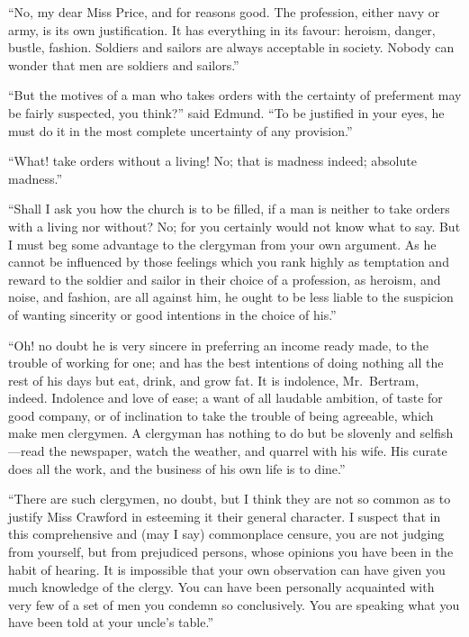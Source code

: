 \documentclass{article}
\begin{document}
``No, my dear Miss Price, and for reasons good.  The profession,
either navy or army, is its own justification.  It has
everything in its favour:  heroism, danger, bustle, fashion.
Soldiers and sailors are always acceptable in society.
Nobody can wonder that men are soldiers and sailors.''

``But the motives of a man who takes orders with the certainty
of preferment may be fairly suspected, you think?''
said Edmund.  ``To be justified in your eyes, he must
do it in the most complete uncertainty of any provision.''

``What! take orders without a living!  No; that is
madness indeed; absolute madness.''

``Shall I ask you how the church is to be filled, if a man
is neither to take orders with a living nor without?
No; for you certainly would not know what to say.
But I must beg some advantage to the clergyman from
your own argument.  As he cannot be influenced by those
feelings which you rank highly as temptation and reward
to the soldier and sailor in their choice of a profession,
as heroism, and noise, and fashion, are all against him,
he ought to be less liable to the suspicion of wanting
sincerity or good intentions in the choice of his.''

``Oh! no doubt he is very sincere in preferring an income
ready made, to the trouble of working for one; and has
the best intentions of doing nothing all the rest of his
days but eat, drink, and grow fat.  It is indolence,
Mr.\ Bertram, indeed.  Indolence and love of ease; a want
of all laudable ambition, of taste for good company,
or of inclination to take the trouble of being agreeable,
which make men clergymen.  A clergyman has nothing
to do but be slovenly and selfish---read the newspaper,
watch the weather, and quarrel with his wife.  His curate
does all the work, and the business of his own life is
to dine.''

``There are such clergymen, no doubt, but I think they
are not so common as to justify Miss Crawford in esteeming
it their general character.  I suspect that in this
comprehensive and (may I say) commonplace censure, you are
not judging from yourself, but from prejudiced persons,
whose opinions you have been in the habit of hearing.
It is impossible that your own observation can have given
you much knowledge of the clergy.  You can have been
personally acquainted with very few of a set of men you
condemn so conclusively.  You are speaking what you have
been told at your uncle's table.''
\end{document}
